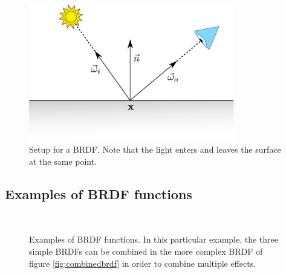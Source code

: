 \begin{figure}[!ht]
\centering
\includegraphics[width=0.8\textwidth]{images/brdf.pdf}
\caption{Setup for a BRDF. Note that the light enters and leaves the surface at the same point.}
\label{fig:brdf}
\end{figure}
 

\subsection{Examples of BRDF functions}

\FloatBarrier
\begin{figure}
\centering
{}
 \\
\label{fig:brdfexamples}
\caption{Examples of BRDF functions. In this particular example, the three simple BRDFs can be combined in the more complex BRDF of figure \ref{fig:combinedbrdf} in order to combine multiple effects.}
\end{figure}


